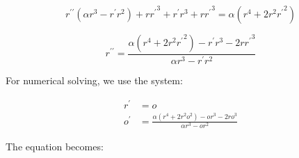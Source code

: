 \documentclass[12pt, a4paper]{report}
\begin{document}
\begin{equation}
r^{\prime\prime}\left(\alpha r^3 - r^{\prime}r^2\right) + r{r^\prime}^3 + r^\prime r^3 + r{r^\prime}^3 =
\alpha \left(r^4 + 2r^2 {r^\prime}^2\right)
\end{equation}

\begin{equation}
r^{\prime\prime} =
\frac{\alpha \left(r^4 + 2r^2 {r^\prime}^2\right) - r^\prime r^3 - 2r{r^\prime}^3 }{\alpha r^3 - r^{\prime}r^2} 
\end{equation}

For numerical solving, we use the system:

\begin {align}
r^\prime &= o \\
o^\prime &= \frac{\alpha \left(r^4 + 2r^2 o^2\right) - o r^3 - 2r o^3 }{\alpha r^3 - o r^2} 
\end{align}

The equation becomes:
\end{document}
